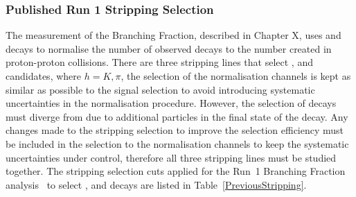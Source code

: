 \subsubsection{Published Run 1 Stripping Selection}
\label{strippingold}
The measurement of the \bsmumu Branching Fraction, described in Chapter X, uses \bujpsik and \bdkpi decays to normalise the number of observed \bsmumu decays to the number created in proton-proton collisions. There are three stripping lines that select \bmumu, \bujpsik and \bhh candidates, where $h = K, \pi$, the selection of the normalisation channels is kept as similar as possible to the signal selection to avoid introducing systematic uncertainties in the normalisation procedure. However, the selection of \bujpsik decays must diverge from \bsmumu due to additional particles in the final state of the decay. Any changes made to the \bmumu stripping selection to improve the selection efficiency must be included in the selection to the normalisation channels to keep the systematic uncertainties under control, therefore all three stripping lines must be studied together. The stripping selection cuts applied for the Run~1 Branching Fraction analysis~\cite{} to select \bmumu, \bhh and \bujpsik decays are listed in Table~\ref{PreviousStripping}.

